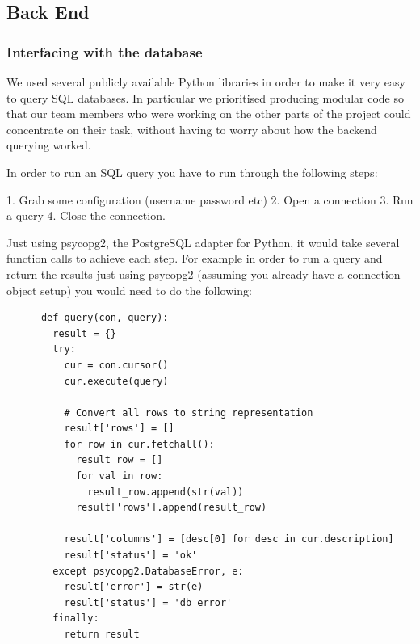 \documentclass[a4paper, 11pt]{article}
\begin{document}
    \subsection{Back End}


    \subsubsection{Interfacing with the database}

      We used several publicly available Python libraries in order to make 
      it very easy to query SQL databases. In particular we prioritised
      producing modular code so that our team members who were working on the
      other parts of the project could concentrate on their task, without having
      to worry about how the backend querying worked.

      In order to run an SQL query you have to run through the following steps:

      1. Grab some configuration (username password etc)
      2. Open a connection
      3. Run a query
      4. Close the connection.

      Just using psycopg2, the PostgreSQL adapter for Python, it would take
      several function calls to achieve each step. For example in order to run a
      query and return the results just using psycopg2 (assuming you already
      have a connection object setup) you would need to do the following:

      \begin{verbatim}
      def query(con, query):
        result = {}
        try:
          cur = con.cursor()
          cur.execute(query)

          # Convert all rows to string representation
          result['rows'] = []
          for row in cur.fetchall():
            result_row = []
            for val in row:
              result_row.append(str(val))
            result['rows'].append(result_row)

          result['columns'] = [desc[0] for desc in cur.description]
          result['status'] = 'ok'
        except psycopg2.DatabaseError, e:
          result['error'] = str(e)
          result['status'] = 'db_error'
        finally:
          return result
      \end{verbatim}
\end{document}
